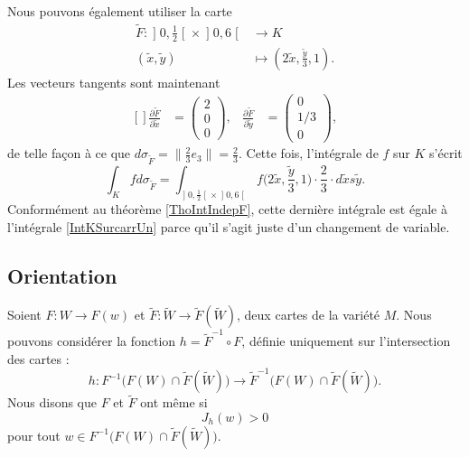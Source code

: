 Nous pouvons également utiliser la carte
\begin{equation}
	\begin{aligned}
		\tilde F\colon \mathopen] 0 , \frac{ 1 }{2} \mathclose[\times\mathopen] 0 , 6 \mathclose[&\to K \\
		(\tilde x,\tilde y)&\mapsto (2\tilde x,\frac{ \tilde y }{ 3 },1). 
	\end{aligned}
\end{equation}
Les vecteurs tangents sont maintenant
\begin{equation}
	\begin{aligned}[]
		\frac{ \partial \tilde F }{ \partial \tilde x }&=\begin{pmatrix}
			2	\\ 
			0	\\ 
			0	
		\end{pmatrix},
		&\frac{ \partial \tilde F }{ \partial \tilde y }&=\begin{pmatrix}
			0	\\ 
			1/3	\\ 
			0	
		\end{pmatrix},
	\end{aligned}
\end{equation}
de telle façon à ce que $d\sigma_{\tilde F}=\| \frac{ 2 }{ 3 }e_3 \|=\frac{ 2 }{ 3 }$. Cette fois, l'intégrale de $f$ sur $K$ s'écrit
\begin{equation}
	\int_Kfd\sigma_{\tilde F}=\int_{\mathopen] 0 , \frac{ 1 }{2} \mathclose[\times\mathopen] 0 , 6 \mathclose[}f\big( 2\tilde x,\frac{ \tilde y }{ 3 },1 \big)\cdot\frac{ 2 }{ 3 }\cdot d\tilde xs\tilde y.
\end{equation}
Conformément au théorème \ref{ThoIntIndepF}, cette dernière intégrale est égale à l'intégrale \eqref{IntKSurcarrUn} parce qu'il s'agit juste d'un changement de variable.

\subsection{Orientation}

Soient $F\colon W\to F(w)$ et $\tilde F\colon \tilde W\to \tilde F(\tilde W)$, deux cartes de la variété $M$. Nous pouvons considérer la fonction $h=\tilde F^{-1}\circ F$, définie uniquement sur l'intersection des cartes :
\begin{equation}
	h\colon F^{-1}\big( F(W)\cap\tilde F(\tilde W) \big)\to \tilde F^{-1}\big( F(W)\cap\tilde F(\tilde W) \big).
\end{equation}
Nous disons que $F$ et $\tilde F$ ont même  si
\begin{equation}
	J_h(w)>0
\end{equation}
pour tout $w\in  F^{-1}\big( F(W)\cap\tilde F(\tilde W) \big)$.

